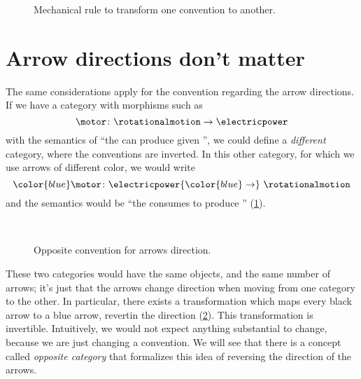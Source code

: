 \begin{figure*}[b]
	\begin{center}
	\end{center}
	\caption{Mechanical rule to transform one convention to another.}
\end{figure*}


\section{Arrow directions don't matter}
The same considerations apply for the convention regarding the arrow directions.
If we have a category with morphisms such as
\begin{equation*}
	\motor \colon \rotationalmotion \to \electricpower
\end{equation*}
with the semantics of ``the \motor can produce \rotationalmotion given \electricpower'', we could define a \emph{different} category, where the conventions are inverted.
In this other category, for which we use arrows of different color, we would write
\begin{equation*}
	{\color{blue}\motor}
	\colon \electricpower {\color{blue} \to}\  \rotationalmotion
\end{equation*}
and the semantics would be ``the \motor consumes \electricpower to produce \rotationalmotion'' (\cref{fig:inverted}).

\begin{figure}[h!]
	\centering
	\\[+15pt]
	\caption{Opposite convention for arrows direction. }
	\label{fig:inverted}
\end{figure}

These two categories would have the same objects, and the same number of arrows; it's just that the arrows change direction when moving from one category to the other.
In particular, there exists a transformation which maps every black arrow to a blue arrow, revertin the direction (\cref{fig:inverted_2}).
This transformation is invertible.
Intuitively, we would not expect anything substantial to change, because we are just changing a convention.
We will see that there is a concept called \emph{opposite category} that formalizes this idea of reversing the direction of the arrows.

\begin{figure}[h!]
	\centering
	\caption{}
	\label{fig:inverted_2}
\end{figure}

